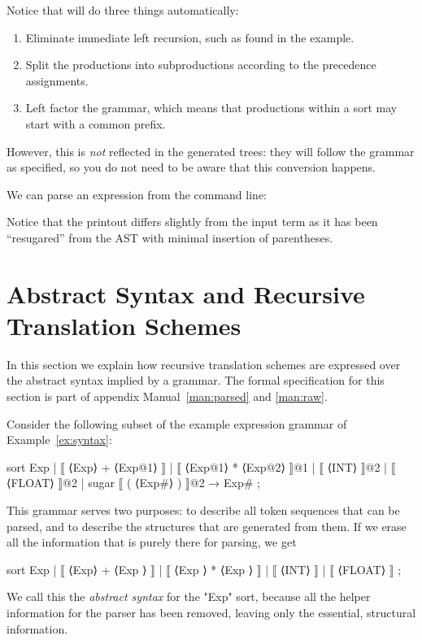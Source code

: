 \documentclass[11pt]{article} %
\begin{document}
Notice that \HAX will do three things automatically:
\begin{enumerate}
\item Eliminate immediate left recursion, such as found in the example.
\item Split the productions into subproductions according to the precedence assignments.
\item Left factor the grammar, which means that productions within a sort may start with a common
  prefix.
\end{enumerate}
However, this is \emph{not} reflected in the generated trees: they will follow the grammar as
specified, so you do not need to be aware that this conversion happens.

\begin{commands}
  We can parse an expression from the command line:
  Notice that the printout differs slightly from the input term as it has been ``resugared'' from
  the AST with minimal insertion of parentheses.
\end{commands}


\section{Abstract Syntax and Recursive Translation Schemes}
\label{sec:schemes}

In this section we explain how recursive translation schemes are expressed over the abstract syntax
implied by a grammar. The formal specification for this section is part of appendix
Manual~\ref{man:parsed} and \ref{man:raw}.

\begin{example}\label{ex:ast}%
  Consider the following subset of the example expression grammar of Example~\ref{ex:syntax}:
  \begin{hacs}[xleftmargin=\parindent]
sort Exp  | ⟦ ⟨Exp⟩ + ⟨Exp@1⟩ ⟧
          | ⟦ ⟨Exp@1⟩ * ⟨Exp@2⟩ ⟧@1
          | ⟦ ⟨INT⟩ ⟧@2
          | ⟦ ⟨FLOAT⟩ ⟧@2
          | sugar ⟦ ( ⟨Exp#⟩ ) ⟧@2 → Exp# ;
  \end{hacs}
  This grammar serves two purposes: to describe all token sequences that can be parsed, and to
  describe the structures that are generated from them. If we erase all the information that is
  purely there for parsing, we get
  \begin{hacs}[xleftmargin=\parindent]
sort Exp  | ⟦ ⟨Exp⟩ + ⟨Exp  ⟩ ⟧
          | ⟦ ⟨Exp  ⟩ * ⟨Exp  ⟩ ⟧
          | ⟦ ⟨INT⟩ ⟧
          | ⟦ ⟨FLOAT⟩ ⟧
          ;
  \end{hacs}
  We call this the \emph{abstract syntax} for the "Exp" sort, because all the helper information
  for the parser has been removed, leaving only the essential, structural information.
\end{example}
\end{document}
